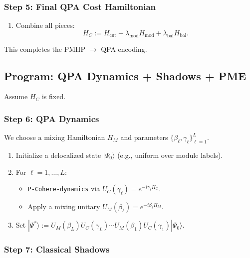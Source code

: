 \documentclass[11pt]{article}
\begin{document}
\subsubsection*{Step 5: Final QPA Cost Hamiltonian}

\begin{enumerate}[label=(5.\arabic*)]
  \item Combine all pieces:
  \[
    H_C := H_{\text{cut}} + \lambda_{\text{mod}} H_{\text{mod}} + \lambda_{\text{bal}} H_{\text{bal}}.
  \]
\end{enumerate}

This completes the PMHP $\to$ QPA encoding.

\subsection{Program: QPA Dynamics + Shadows + PME}

Assume $H_C$ is fixed.

\subsubsection*{Step 6: QPA Dynamics}

We choose a mixing Hamiltonian $H_M$ and parameters $\{\beta_\ell,\gamma_\ell\}_{\ell=1}^L$.

\begin{enumerate}[label=(6.\arabic*)]
  \item Initialize a delocalized state $|\Psi_0\rangle$ (e.g., uniform over module labels).
  \item For $\ell=1,\dots,L$:
  \begin{itemize}
    \item \texttt{P-Cohere-dynamics} via $U_C(\gamma_\ell) = e^{-i\gamma_\ell H_C}$.
    \item Apply a mixing unitary $U_M(\beta_\ell)=e^{-i\beta_\ell H_M}$.
  \end{itemize}
  \item Set $|\Psi^*\rangle := U_M(\beta_L)U_C(\gamma_L)\cdots U_M(\beta_1)U_C(\gamma_1)|\Psi_0\rangle$.
\end{enumerate}

\subsubsection*{Step 7: Classical Shadows}
\end{document}
